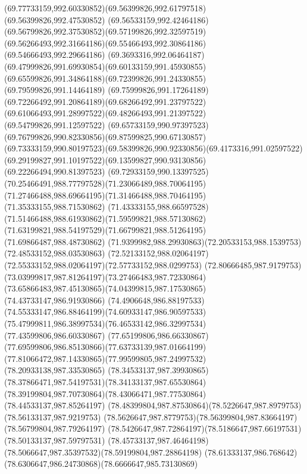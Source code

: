 {    \curveto(69.77733159,992.60330852)(69.56399826,992.61797518)(69.56399826,992.47530852)
    \curveto(69.56533159,992.42464186)(69.56799826,992.37530852)(69.57199826,992.32597519)
    \curveto(69.56266493,992.31664186)(69.55466493,992.30864186)(69.54666493,992.29664186)
    \curveto(69.3693316,992.06464187)(69.47999826,991.69930854)(69.60133159,991.45930855)
    \curveto(69.65599826,991.34864188)(69.72399826,991.24330855)(69.79599826,991.14464189)
    \curveto(69.75999826,991.17264189)(69.72266492,991.20864189)(69.68266492,991.23797522)
    \curveto(69.61066493,991.28997522)(69.48266493,991.21397522)(69.54799826,991.12597522)
    \curveto(69.65733159,990.97397523)(69.76799826,990.82330856)(69.87599825,990.67130857)
    \curveto(69.73333159,990.80197523)(69.58399826,990.92330856)(69.4173316,991.02597522)
    \curveto(69.29199827,991.10197522)(69.13599827,990.93130856)(69.22266494,990.81397523)
    \curveto(69.72933159,990.13397525)(70.25466491,988.77797528)(71.23066489,988.70064195)
    \curveto(71.27466488,988.69664195)(71.31466488,988.70464195)(71.35333155,988.71530862)
    \curveto(71.43333155,988.66597528)(71.51466488,988.61930862)(71.59599821,988.57130862)
    \curveto(71.63199821,988.54197529)(71.66799821,988.51264195)(71.69866487,988.48730862)
    \curveto(71.9399982,988.29930863)(72.20533153,988.1539753)(72.48533152,988.03530863)
    \curveto(72.52133152,988.02064197)(72.55333152,988.02064197)(72.57733152,988.0299753)
    \curveto(72.80666485,987.9179753)(73.03999817,987.81264197)(73.27466483,987.72330864)
    \curveto(73.65866483,987.45130865)(74.04399815,987.17530865)(74.43733147,986.91930866)
    \curveto(74.4906648,986.88197533)(74.55333147,986.88464199)(74.60933147,986.90597533)
    \curveto(75.47999811,986.38997534)(76.46533142,986.32997534)(77.43599806,986.60330867)
    \curveto(77.65199806,986.66330867)(77.69599806,986.85130866)(77.63733139,987.01664199)
    \curveto(77.81066472,987.14330865)(77.99599805,987.24997532)(78.20933138,987.33530865)
    \curveto(78.34533137,987.39930865)(78.37866471,987.54197531)(78.34133137,987.65530864)
    \curveto(78.39199804,987.70730864)(78.43066471,987.77530864)(78.44533137,987.85264197)
    \curveto(78.48399804,987.87530864)(78.5226647,987.8979753)(78.56133137,987.9219753)
    \curveto(78.5626647,987.8779753)(78.56399804,987.83664197)(78.56799804,987.79264197)
    \curveto(78.5426647,987.72864197)(78.5186647,987.66197531)(78.50133137,987.59797531)
    \curveto(78.45733137,987.46464198)(78.5066647,987.35397532)(78.59199804,987.28864198)
    \curveto(78.61333137,986.768642)(78.6306647,986.24730868)(78.6666647,985.73130869)
}
